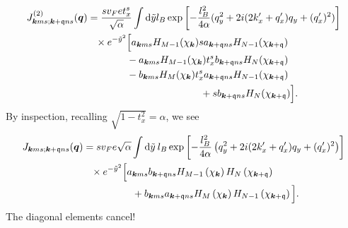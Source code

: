 \begin{equation}
   \label{eq:105}
  \begin{split}
  J_{\vec{k} m s; \vec{k} + \qvec{q} n s}^{(2)} (\vec{q}) &=
  \frac{s v_F e t^s_x}{\sqrt{\alpha}}
  \int \mathrm{d} \tilde{y} l_B
    \exp \left[
      -\frac{l_{B}^2}{4 \alpha } (q_{y}^2 + 2i (2 k'_x + q' _x) q_{y}  + (q'_x)^2 )
    \right]\\
    &\pe \times e^{-\tilde{y}^2}
    \begin{multlined}[t]
      \Big[
      a_{\vec{k} m s} H_{M-1}( \chi _{\vec{k}} ) s a_{\vec{k} + \qvec{q} n s} H_{N-1}( \chi _{\vec{k} + \qvec{q}} )\\
      \shoveleft-a_{\vec{k} m s} H_{M-1}( \chi _{\vec{k}} ) t^s_{x} b_{\vec{k} + \qvec{q} n s} H_{N}( \chi _{\vec{k} + \qvec{q}} )\\
      \shoveleft- b_{\vec{k} m s} H_{M}( \chi _{\vec{k}} ) t^s_{x} a_{\vec{k} + \qvec{q} n s} H_{N-1}( \chi _{\vec{k} + \qvec{q}} )\\
      + s b_{\vec{k} + \qvec{q} n s} H_{N}( \chi _{\vec{k} + \qvec{q}} )
      \Big].
    \end{multlined}
  \end{split}
\end{equation}
By inspection,  recalling \( \sqrt{1 - t_x^2} = \alpha \), we see
{%
\setlength\multlinegap{0pt}  %
\begin{align}
J_{\vec{k}ms; \vec{k}+\qvec{q} ns}(\vec{q}) &=
  s v_F e \sqrt{\alpha} \int \mathrm{d}\tilde{y} \: l_B
  \exp \left[
    -\frac{l_{B}^2}{4 \alpha } \left(q_{y}^2 + 2i (2 k' _x + q' _x) q_{y} + (q'_x)^2 \right)
  \right]\nonumber\\
  &\pe\times e^{-\tilde{y}^2}
    \begin{multlined}[t]
      \Big[
      a_{\vec{k}ms}b_{\vec{k} + \qvec{q} ns}
      H_{M-1} \left(  \chi_{\vec{k}} \right)
      H_N\left( \chi_{\vec{k} + \qvec{q}} \right)\\
      +
      b_{\vec{k}ms} a_{\vec{k} + \qvec{q} ns}
      H_M \left( \chi_{\vec{k}} \right)
      H_{N-1} \left( \chi_{\vec{k} + \qvec{q}} \right)
      \Big].
    \end{multlined}
\end{align}}
The diagonal elements cancel!

